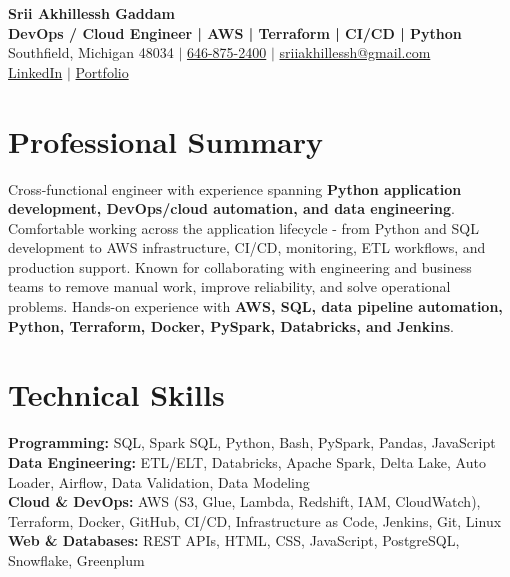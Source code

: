 \documentclass[letterpaper,10pt]{article}
\begin{document}
\fontsize{9.35pt}{10.45pt}\selectfont

\begin{center}
    {\LARGE \textbf{Srii Akhillessh Gaddam}} \\[-1pt]
    \textbf{DevOps / Cloud Engineer | AWS | Terraform | CI/CD | Python} \\[2pt]
    Southfield, Michigan 48034 $|$
    \href{tel:6468752400}{646-875-2400} $|$
    \href{mailto:sriiakhillessh@gmail.com}{sriiakhillessh@gmail.com} \\[1pt]
    \href{https://www.linkedin.com/in/srii-akhiilessh-gaddam-b48668191/}{LinkedIn} $|$
    \href{https://sriiakhillesshg.github.io/portfolio/}{Portfolio}
\end{center}
\vspace{-8pt}

\section{Professional Summary}
\small{Cross-functional engineer with experience spanning \textbf{Python application development, DevOps/cloud automation, and data engineering}. Comfortable working across the application lifecycle - from Python and SQL development to AWS infrastructure, CI/CD, monitoring, ETL workflows, and production support. Known for collaborating with engineering and business teams to remove manual work, improve reliability, and solve operational problems. Hands-on experience with \textbf{AWS, SQL, data pipeline automation, Python, Terraform, Docker, PySpark, Databricks, and Jenkins}.}

\section{Technical Skills}
\small{
\textbf{Programming:} SQL, Spark SQL, Python, Bash, PySpark, Pandas, JavaScript \\
\textbf{Data Engineering:} ETL/ELT, Databricks, Apache Spark, Delta Lake, Auto Loader, Airflow, Data Validation, Data Modeling \\
\textbf{Cloud \& DevOps:} AWS (S3, Glue, Lambda, Redshift, IAM, CloudWatch), Terraform, Docker, GitHub, CI/CD, Infrastructure as Code, Jenkins, Git, Linux \\
\textbf{Web \& Databases:} REST APIs, HTML, CSS, JavaScript, PostgreSQL, Snowflake, Greenplum
}
\end{document}

